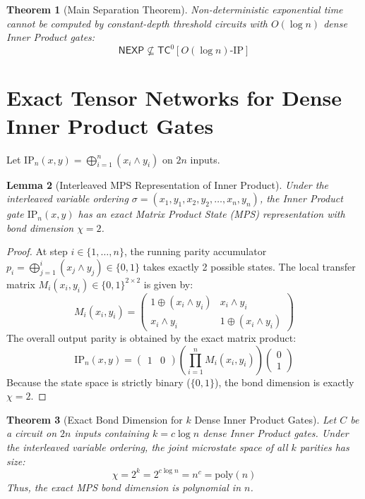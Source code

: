 \documentclass[11pt,letterpaper]{article}
\newtheorem{theorem}{Theorem}[section]
\newtheorem{lemma}[theorem]{Lemma}
\newcommand{\NEXP}{\mathsf{NEXP}}
\newcommand{\TC}{\mathsf{TC}}
\newcommand{\poly}{\mathrm{poly}}
\begin{document}
\begin{theorem}[Main Separation Theorem]
\label{thm:main_separation}
Non-deterministic exponential time cannot be computed by constant-depth threshold circuits with $O(\log n)$ dense Inner Product gates:
\[
\NEXP \not\subseteq \TC^0[O(\log n)\text{-}\mathrm{IP}]
\]
\end{theorem}

\section{Exact Tensor Networks for Dense Inner Product Gates}

Let $\mathrm{IP}_n(x, y) = \bigoplus_{i=1}^n (x_i \land y_i)$ on $2n$ inputs. 

\begin{lemma}[Interleaved MPS Representation of Inner Product]
\label{lem:ip_mps}
Under the interleaved variable ordering $\sigma = (x_1, y_1, x_2, y_2, \dots, x_n, y_n)$, the Inner Product gate $\mathrm{IP}_n(x, y)$ has an exact Matrix Product State (MPS) representation with bond dimension $\chi = 2$.
\end{lemma}

\begin{proof}
At step $i \in \{1, \dots, n\}$, the running parity accumulator $p_i = \bigoplus_{j=1}^i (x_j \land y_j) \in \{0, 1\}$ takes exactly 2 possible states. The local transfer matrix $M_i(x_i, y_i) \in \{0,1\}^{2 \times 2}$ is given by:
\[
M_i(x_i, y_i) = \begin{pmatrix} 1 \oplus (x_i \land y_i) & x_i \land y_i \\ x_i \land y_i & 1 \oplus (x_i \land y_i) \end{pmatrix}
\]
The overall output parity is obtained by the exact matrix product:
\[
\mathrm{IP}_n(x, y) = \begin{pmatrix} 1 & 0 \end{pmatrix} \left( \prod_{i=1}^n M_i(x_i, y_i) \right) \begin{pmatrix} 0 \\ 1 \end{pmatrix}
\]
Because the state space is strictly binary ($\{0, 1\}$), the bond dimension is exactly $\chi = 2$.
\end{proof}

\begin{theorem}[Exact Bond Dimension for $k$ Dense Inner Product Gates]
\label{thm:k_ip_mps}
Let $C$ be a circuit on $2n$ inputs containing $k = c \log n$ dense Inner Product gates. Under the interleaved variable ordering, the joint microstate space of all $k$ parities has size:
\[
\chi = 2^k = 2^{c \log n} = n^c = \poly(n)
\]
Thus, the exact MPS bond dimension is polynomial in $n$.
\end{theorem}
\end{document}
